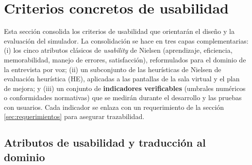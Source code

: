 \section{Criterios concretos de usabilidad}
\label{sec:usabilidad}

Esta sección consolida los criterios de usabilidad que orientarán el
diseño y la evaluación del simulador. La consolidación se hace en tres
capas complementarias: (i) los cinco atributos clásicos de
\textit{usability} de Nielsen (aprendizaje, eficiencia, memorabilidad,
manejo de errores, satisfacción), reformulados para el dominio de la
entrevista por voz; (ii) un subconjunto de las heurísticas de Nielsen
de evaluación heurística (HE), aplicadas a las pantallas de la sala
virtual y el plan de mejora; y (iii) un conjunto de \textbf{indicadores
verificables} (umbrales numéricos o conformidades normativas) que se
medirán durante el desarrollo y las pruebas con usuarios. Cada
indicador se enlaza con un requerimiento de la sección
\ref{sec:requerimientos} para asegurar trazabilidad.

\subsection{Atributos de usabilidad y traducción al dominio}

